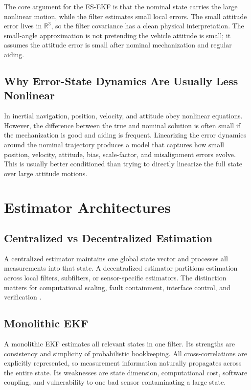 \documentclass[11pt,oneside]{book}
\newcommand{\R}{\mathbb{R}}
\begin{document}
\begin{interviewbox}
The core argument for the ES-EKF is that the nominal state carries the large nonlinear motion, while the filter estimates small local errors. The small attitude error lives in \(\R^3\), so the filter covariance has a clean physical interpretation. The small-angle approximation is not pretending the vehicle attitude is small; it assumes the attitude error is small after nominal mechanization and regular aiding.
\end{interviewbox}

\subsection{Why Error-State Dynamics Are Usually Less Nonlinear}
In inertial navigation, position, velocity, and attitude obey nonlinear equations. However, the difference between the true and nominal solution is often small if the mechanization is good and aiding is frequent. Linearizing the error dynamics around the nominal trajectory produces a model that captures how small position, velocity, attitude, bias, scale-factor, and misalignment errors evolve. This is usually better conditioned than trying to directly linearize the full state over large attitude motions.

\section{Estimator Architectures}

\subsection{Centralized vs Decentralized Estimation}
A centralized estimator maintains one global state vector and processes all measurements into that state. A decentralized estimator partitions estimation across local filters, subfilters, or sensor-specific estimators. The distinction matters for computational scaling, fault containment, interface control, and verification \cite{simon2006,barshalom2001,farrell2008}.

\subsection{Monolithic EKF}
A monolithic EKF estimates all relevant states in one filter. Its strengths are consistency and simplicity of probabilistic bookkeeping. All cross-correlations are explicitly represented, so measurement information naturally propagates across the entire state. Its weaknesses are state dimension, computational cost, software coupling, and vulnerability to one bad sensor contaminating a large state.
\end{document}

